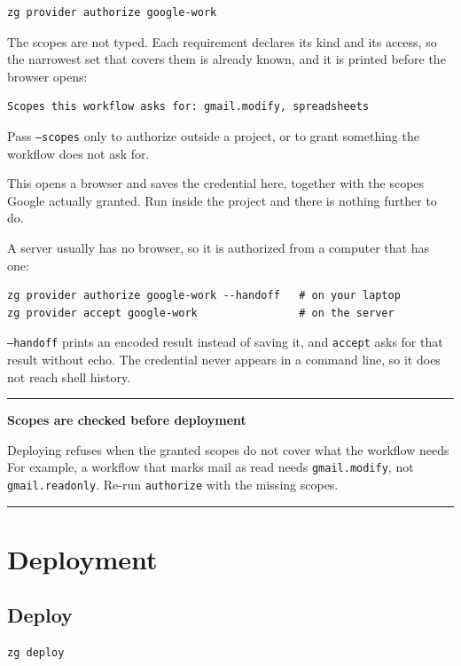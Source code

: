 \documentclass[11pt,a4paper]{article}
\newenvironment{warningbox}[1]
{\begin{center}\begin{minipage}{0.94\linewidth}
 \color{WarningBorder}\hrule\vspace{5pt}
 \color{ZipperInk}\textbf{#1}\par\smallskip}
{\vspace{5pt}\color{WarningBorder}\hrule\end{minipage}\end{center}}
\begin{document}
\begin{lstlisting}[style=shell]
zg provider authorize google-work
\end{lstlisting}

The scopes are not typed. Each requirement declares its kind and its access,
so the narrowest set that covers them is already known, and it is printed
before the browser opens:

\begin{lstlisting}[style=shell]
Scopes this workflow asks for: gmail.modify, spreadsheets
\end{lstlisting}

Pass \texttt{--scopes} only to authorize outside a project, or to grant
something the workflow does not ask for.

This opens a browser and saves the credential here, together with the scopes
Google actually granted. Run inside the project and there is nothing further
to do.

A server usually has no browser, so it is authorized from a computer that has
one:

\begin{lstlisting}[style=shell]
zg provider authorize google-work --handoff   # on your laptop
zg provider accept google-work                # on the server
\end{lstlisting}

\texttt{--handoff} prints an encoded result instead of saving it, and
\texttt{accept} asks for that result without echo. The credential never
appears in a command line, so it does not reach shell history.

\begin{warningbox}{Scopes are checked before deployment}
Deploying refuses when the granted scopes do not cover what the workflow needs
For example, a workflow that marks mail as read needs
\texttt{gmail.modify}, not \texttt{gmail.readonly}. Re-run
\texttt{authorize} with the missing scopes.
\end{warningbox}

\section{Deployment}

\subsection{Deploy}

\begin{lstlisting}[style=shell]
zg deploy
\end{lstlisting}
\end{document}
